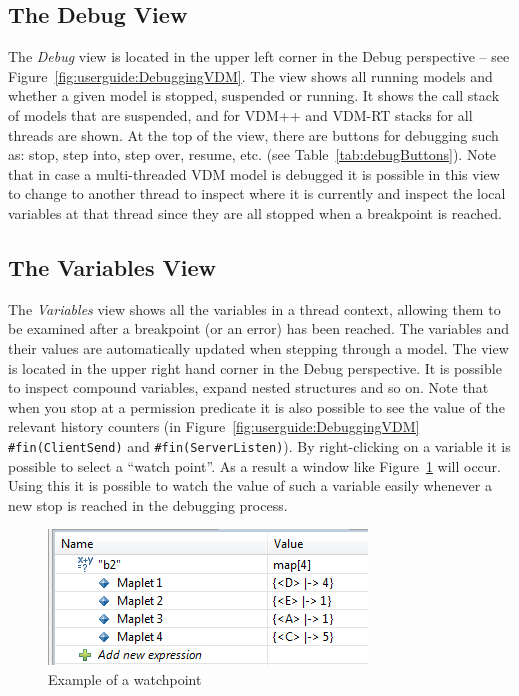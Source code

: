 \documentclass{overturerepchap}
\begin{document}
\subsection{The Debug View}

The \emph{Debug} view is located in the upper left corner in the Debug perspective --
see Figure~\ref{fig:userguide:DebuggingVDM}. The view shows all running
models and whether a given model is stopped, suspended or running.
It shows the call stack of models that are suspended, and for VDM++ and VDM-RT stacks
for all threads are shown.
At the top of the view, there are buttons
for debugging such as: stop, step into, step over, resume, etc. (see
Table~\ref{tab:debugButtons}). Note that in case a multi-threaded VDM
model is debugged it is possible in this view to change to another
thread to inspect where it is currently and inspect the local
variables at that thread since they are all stopped when a breakpoint
is reached.

\subsection{The Variables View}
 
The \emph{Variables} view shows all the variables in a thread context, allowing them to be
examined after a breakpoint (or an error) has been reached. The variables and their values are
automatically updated when stepping through a model. The view is
located in the upper right hand corner in the Debug perspective. It is
possible to inspect compound variables, expand nested structures and
so on. Note that when you stop at a permission predicate it is also
possible to see the value of the relevant history counters (in
Figure~\ref{fig:userguide:DebuggingVDM} \texttt{\#fin(ClientSend)} and
\texttt{\#fin(ServerListen)}). By right-clicking on a variable it is
possible to select a ``watch point''. As a result a window like
Figure~\ref{fig:watchpoint} will occur. Using this it is possible to
watch the value of such a variable easily whenever a new stop is
reached in the debugging process.

\begin{figure}[htp]
\begin{center}
  \includegraphics[width=.5\textwidth]{screenDumps/watchpoint}
  \caption{Example of a watchpoint}
  \label{fig:watchpoint}
\end{center}
\end{figure}
\end{document}
